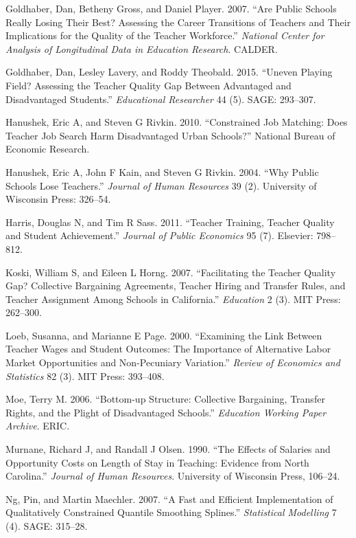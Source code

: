 \documentclass[12pt,]{article}
\begin{document}
\hypertarget{ref-goldhaber2007}{}
Goldhaber, Dan, Betheny Gross, and Daniel Player. 2007. ``Are Public
Schools Really Losing Their Best? Assessing the Career Transitions of
Teachers and Their Implications for the Quality of the Teacher
Workforce.'' \emph{National Center for Analysis of Longitudinal Data in
Education Research}. CALDER.

\hypertarget{ref-goldhaber2015}{}
Goldhaber, Dan, Lesley Lavery, and Roddy Theobald. 2015. ``Uneven
Playing Field? Assessing the Teacher Quality Gap Between Advantaged and
Disadvantaged Students.'' \emph{Educational Researcher} 44 (5). SAGE:
293--307.

\hypertarget{ref-hanushek2010}{}
Hanushek, Eric A, and Steven G Rivkin. 2010. ``Constrained Job Matching:
Does Teacher Job Search Harm Disadvantaged Urban Schools?'' National
Bureau of Economic Research.

\hypertarget{ref-hanushek}{}
Hanushek, Eric A, John F Kain, and Steven G Rivkin. 2004. ``Why Public
Schools Lose Teachers.'' \emph{Journal of Human Resources} 39 (2).
University of Wisconsin Press: 326--54.

\hypertarget{ref-harris}{}
Harris, Douglas N, and Tim R Sass. 2011. ``Teacher Training, Teacher
Quality and Student Achievement.'' \emph{Journal of Public Economics} 95
(7). Elsevier: 798--812.

\hypertarget{ref-koski}{}
Koski, William S, and Eileen L Horng. 2007. ``Facilitating the Teacher
Quality Gap? Collective Bargaining Agreements, Teacher Hiring and
Transfer Rules, and Teacher Assignment Among Schools in California.''
\emph{Education} 2 (3). MIT Press: 262--300.

\hypertarget{ref-loeb}{}
Loeb, Susanna, and Marianne E Page. 2000. ``Examining the Link Between
Teacher Wages and Student Outcomes: The Importance of Alternative Labor
Market Opportunities and Non-Pecuniary Variation.'' \emph{Review of
Economics and Statistics} 82 (3). MIT Press: 393--408.

\hypertarget{ref-moe}{}
Moe, Terry M. 2006. ``Bottom-up Structure: Collective Bargaining,
Transfer Rights, and the Plight of Disadvantaged Schools.''
\emph{Education Working Paper Archive}. ERIC.

\hypertarget{ref-murnane}{}
Murnane, Richard J, and Randall J Olsen. 1990. ``The Effects of Salaries
and Opportunity Costs on Length of Stay in Teaching: Evidence from North
Carolina.'' \emph{Journal of Human Resources}. University of Wisconsin
Press, 106--24.

\hypertarget{ref-ng}{}
Ng, Pin, and Martin Maechler. 2007. ``A Fast and Efficient
Implementation of Qualitatively Constrained Quantile Smoothing
Splines.'' \emph{Statistical Modelling} 7 (4). SAGE: 315--28.
\end{document}
